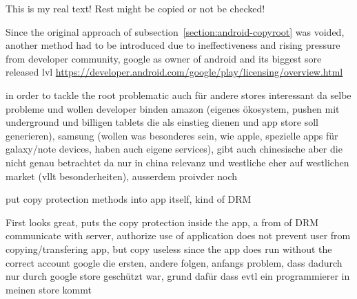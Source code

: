 This is my real text! Rest might be copied or not be checked!

Since the original approach of subsection~\ref{section:android-copyroot} was voided, another method had to be introduced due to ineffectiveness and rising pressure from developer community, google as owner of android and its biggest sore released lvl \url{https://developer.android.com/google/play/licensing/overview.html}

in order to tackle the root problematic 
auch für andere stores interessant da selbe probleme und wollen developer binden
amazon (eigenes ökosystem, pushen mit underground und billigen tablets die als einstieg dienen und app store soll generieren), samsung (wollen was besonderes sein, wie apple, spezielle apps für galaxy/note devices, haben auch eigene services), gibt auch chinesische aber die nicht genau betrachtet da nur in china relevanz und westliche eher auf westlichen market (vllt besonderheiten), ausserdem proivder noch
\cite{munteanLicense}


put copy protection methods into app itself, kind of DRM


First looks great, puts the copy protection inside the app, a from of DRM\newline
communicate with server, authorize use of application\newline
does not prevent user from copying/transfering app, but copy useless since the app does run without the correct account\newline
google die ersten, andere folgen, anfangs problem, dass dadurch nur durch google store geschützt war, grund dafür dass evtl ein programmierer in meinen store kommt\newline

